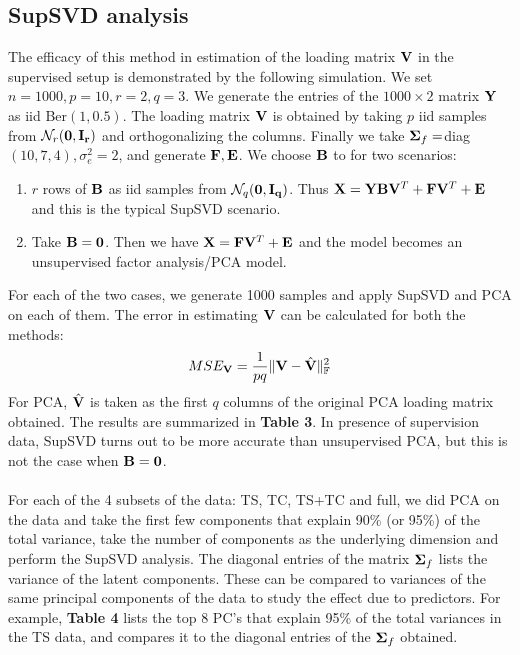 \documentclass[11pt]{llncs}
\begin{document}
\subsection{SupSVD analysis}The efficacy of this method in estimation of the loading matrix ${\mathbf{V}}$ in the supervised setup is demonstrated by the following simulation. We set $n=1000,p=10,r=2,q=3$. We generate the entries of the $1000\times 2$ matrix ${\mathbf{Y}}$ as iid Ber$(1,0.5)$. The loading matrix ${\mathbf{V}}$ is obtained by taking $p$ iid samples from $\mathcal{N}_r(\bf0,{\mathbf{I}}_r)$ and orthogonalizing the columns. Finally we take ${\boldsymbol{\Sigma}}_f=$diag$(10,7,4),\sigma_e^2=2$, and generate ${\mathbf{F}},{\mathbf{E}}$. We choose ${\mathbf{B}}$ to for two scenarios:
\begin{enumerate}
\item $r$ rows of ${\mathbf{B}}$ as iid samples from $\mathcal{N}_q(\bf0,{\mathbf{I}}_q)$. Thus $ {\mathbf{X}} = {\mathbf{Y}}{\mathbf{B}}{\mathbf{V}}^T + {\mathbf{F}}{\mathbf{V}}^T + {\mathbf{E}} $ and this is the typical SupSVD scenario.
\item Take ${\mathbf{B}}=\bf0$. Then we have $ {\mathbf{X}} = {\mathbf{F}}{\mathbf{V}}^T + {\mathbf{E}} $ and the model becomes an unsupervised factor analysis/PCA model.
\end{enumerate}
For each of the two cases, we generate 1000 samples and apply SupSVD and PCA on each of them. The error in estimating ${\mathbf{V}}$ can be calculated for both the methods:
$$ MSE_{{\mathbf{V}}} = \frac{1}{pq}\Vert{\mathbf{V}}-\hat{{\mathbf{V}}}\Vert^2_\mathbb{F} $$
For PCA, $\hat{{\mathbf{V}}}$ is taken as the first $q$ columns of the original PCA loading matrix obtained. The results are summarized in \textbf{Table 3}. In presence of supervision data, SupSVD turns out to be more accurate than unsupervised PCA, but this is not the case when ${\mathbf{B}}=\bf0$.

\paragraph{}For each of the 4 subsets of the data: TS, TC, TS+TC and full, we did PCA on the data and take the first few components that explain 90\% (or 95\%) of the total variance, take the number of components as the underlying dimension and perform the SupSVD analysis. The diagonal entries of the matrix ${\boldsymbol{\Sigma}}_f$ lists the variance of the latent components. These can be compared to variances of the same principal components of the data to study the effect due to predictors. For example, \textbf{Table 4} lists the top 8 PC's that explain 95\% of the total variances in the TS data, and compares it to the diagonal entries of the ${\boldsymbol{\Sigma}}_f$ obtained.
\end{document}
